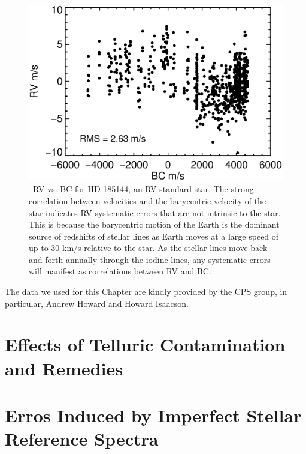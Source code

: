 \begin{figure}
\centering
\includegraphics[scale=0.32]{keck/185144_RV_BC.eps}
\caption{\keck\ RV vs. BC for HD 185144, an RV standard star. The
strong correlation between velocities and the barycentric velocity of
the star indicates RV systematic errors that are not intrinsic to the
star. This is because the barycentric motion of the Earth is the
dominant source of redshifts of stellar lines as Earth moves at a
large speed of up to 30 km/s relative to the star. As the stellar
lines move back and forth annually through the iodine lines, any
systematic errors will manifest as correlations between RV and BC.
\label{keck:fig:sigdra}}
\end{figure}

The data we used for this Chapter are kindly provided by the CPS
group, in particular, Andrew Howard and Howard Isaacson. 


\section{Effects of Telluric Contamination and
  Remedies}\label{keck:sec:telluric} 






\section{Erros Induced by Imperfect Stellar Reference Spectra}\label{keck:sec:dsst}

